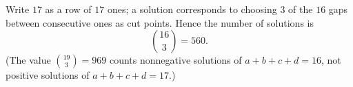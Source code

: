 Write $17$ as a row of $17$ ones; a solution corresponds to choosing $3$ of the $16$ gaps between consecutive ones as cut points. Hence the number of solutions is
\[
\binom{16}{3}=\boxed{560}.
\]
(The value $\binom{19}{3}=969$ counts nonnegative solutions of $a+b+c+d=16$, not positive solutions of $a+b+c+d=17$.)
